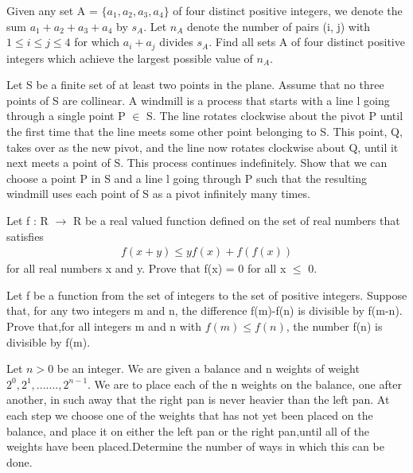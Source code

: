 \item Given any set A = $\{a_1, a_2, a_3, a_4\}$ of four distinct positive integers, we denote the sum $a_1 + a_2 + a_3 + a_4$ by $s_A$. Let $n_A$ denote the number of pairs (i, j) with $1 \leq i \leq j \leq 4$ for which $a_i + a_j$ divides $s_A$. Find all sets A of four distinct positive integers which achieve the largest possible value of $n_A$.

\item Let S be a finite set of at least two points in the plane. Assume that no three points of S are collinear. A windmill is a process that starts with a line l going through a single point P $ \in $ S. The line rotates clockwise about the pivot P until the first time that the line meets some other point belonging to S. This point, Q, takes over as the new pivot, and the line now rotates clockwise about Q, until it next meets a point of S. This process continues indefinitely. Show that we can choose a point P in S and a line l going through P such that the resulting windmill uses each point of S as a pivot infinitely many times.

\item Let f : R $ \to $ R be a real valued function defined on the set of real numbers that satisfies
\begin{align*}
f(x + y) \leq yf(x) + f(f(x))
\end{align*}
for all real numbers x and y. Prove that f(x) = 0 for all x $\leq$ 0.

\item Let f be a function from the set of integers to the set of positive integers. Suppose that, for any two integers m and n, the difference f(m)-f(n) is divisible by f(m-n). Prove that,for all integers m and n with $f(m) \leq f(n)$, the number f(n) is divisible by f(m).

\item Let $n > 0$ be an integer. We are given a balance and n weights of weight $2^{0}, 2^{1},.......,2^{n-1}$. We are to place each of the n weights on the balance, one after another, in such away that the right pan is never heavier than the left pan. At each step we choose one of the weights that has not yet been placed on the balance, and place it on either the left pan or the right pan,until all of the weights have been placed.Determine the number of ways in which this can be done.
